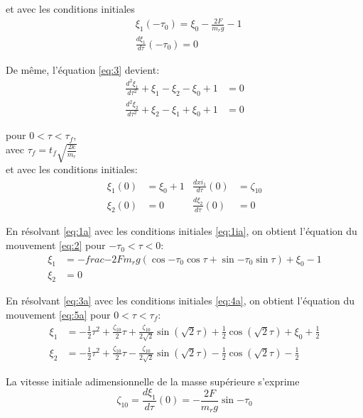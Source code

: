 et avec les conditions initiales
\begin{align}
    &\xi_1(-\tau_0)=\xi_0-\frac{2F}{m_r g}-1 \nonumber\\
    &\frac{d\xi_1}{d\tau}(-\tau_0)=0
\label{eq:1ia}
\end{align}
 

De même, l'équation \ref{eq:3} devient:
\begin{align}
    \frac{d^2\xi_1}{d\tau^2}+\xi_1-\xi_2-\xi_0+1&=0 \nonumber\\
    \frac{d^2\xi_2}{d\tau^2}+\xi_2-\xi_1+\xi_0+1&=0
  \label{eq:3a}
\end{align}

pour $0<\tau<\tau_f$,\\
avec $\tau_f=t_f \sqrt{\frac{2k}{m_r}}$ \\
et avec les conditions initiales: 
\begin{align}
    \xi_1(0)&=\xi_0+1   &  \frac{d xi_1}{d\tau}(0)&=\zeta_{10} \nonumber\\
    \xi_2(0)&=0   &  \frac{d \xi_2}{d\tau}(0)&=0
  \label{eq:4a}
\end{align} 

En résolvant \ref{eq:1a} avec les conditions initiales \ref{eq:1ia}, on obtient l'équation du mouvement \ref{eq:2} pour $-\tau_0<\tau<0$:
\begin{align}
    \xi_1&=-frac{-2F}{m_r g}(\cos{-\tau_0}\cos{\tau}+\sin{-\tau_0}\sin{\tau})+\xi_0-1 \nonumber\\
    \xi_2&=0
  \label{eq:2}
\end{align}

En résolvant \ref{eq:3a} avec les conditions initiales \ref{eq:4a}, on obtient l'équation du mouvement \ref{eq:5a} pour $0<\tau<\tau_f$:
\begin{align}
    \xi_1&=-\frac{1}{2}\tau^2+\frac{\zeta_{10}}{2}\tau+\frac{\zeta_{10}}{2\sqrt{2}}\sin{(\sqrt{2}\tau)}+\frac{1}{2}\cos{(\sqrt{2}\tau)}+\xi_0+\frac{1}{2} \nonumber\\
    \xi_2&=-\frac{1}{2}\tau^2+\frac{\zeta_{10}}{2}\tau-\frac{\zeta_{10}}{2\sqrt{2}}\sin{(\sqrt{2}\tau)}-\frac{1}{2}\cos{(\sqrt{2}\tau)}-\frac{1}{2}
  \label{eq:5a}
\end{align}

La vitesse initiale adimensionnelle de la masse supérieure s'exprime
\begin{equation}
    \zeta_{10}=\frac{d\xi_1}{d\tau}(0)=-\frac{2F}{m_r g}\sin{-\tau_0}
    \label{eq:c1}
\end{equation}



